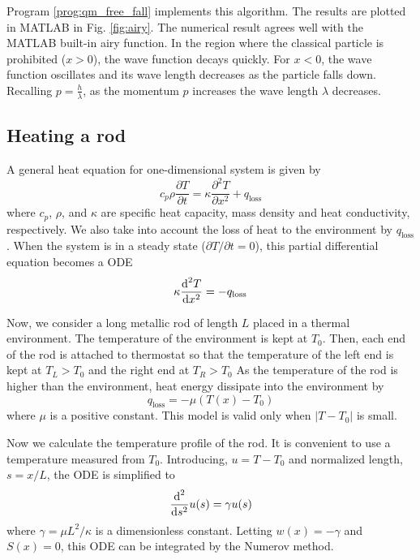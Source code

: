 Program \ref{prog:qm_free_fall} implements this algorithm.
The results are plotted in MATLAB in Fig. \ref{fig:airy}.  The numerical result agrees well  with the MATLAB built-in airy function.  In the region where the classical particle is prohibited ($x>0$), the wave function decays quickly.  For $x<0$, the wave function oscillates and its wave length decreases as the particle falls down.  Recalling $p=\frac{h}{\lambda}$, as the momentum $p$ increases the wave length $\lambda$ decreases.

 

\subsection{Heating a rod}\label{sec:heating_rod}



A general heat equation for one-dimensional system is given by
\begin{equation}
c_p \rho \frac{\partial T}{\partial t} = \kappa \frac{\partial^2 T}{\partial x^2} + q_\text{loss}
\end{equation}
where $c_p$, $\rho$, and $\kappa$ are specific heat capacity, mass density and heat conductivity, respectively. We also take into account the loss of heat to the environment by $q_\text{loss}$. When the system is in a steady state ($\partial T/\partial t = 0$), this partial differential equation becomes a ODE
\begin{equation}
\kappa \frac{\text{d}^2 T}{\text{d} x^2} = - q_\text{loss}
\end{equation}

Now, we consider a long metallic rod of length $L$ placed in a thermal environment.  The temperature of the environment is kept at $T_0$.
Then, each end of the rod is attached to thermostat so that the temperature of the left end is kept at $T_L>T_0$ and the right end at $T_R >T_0$  As the temperature of the rod is higher than the environment, heat energy dissipate into the environment by
\begin{equation}\label{eq:loss_linear}
q_\text{loss} = - \mu (T(x) - T_0)
\end{equation}
where $\mu$ is a positive constant. This model is valid only when $|T-T_0|$ is small.

Now we calculate the temperature profile of the rod.   It is convenient to use a temperature measured from $T_0$.  Introducing, $u=T-T_0$ and normalized length, $s=x/L$,  the ODE is simplified to
\begin{equation}\label{eq:heating_rod}
\frac{\text{d} ^2}{\text{d} s^2} u(s) = \gamma u(s)
\end{equation}
where $\gamma = \mu L^2/\kappa$ is a dimensionless constant. Letting $w(x)=-\gamma$ and $S(x)=0$, this ODE can be integrated by the Numerov method.


